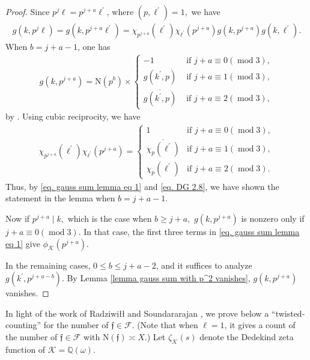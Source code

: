 \documentclass[11pt]{amsart}
\newcommand{\norm}{\mathrm{N}}
\numberwithin{equation}{section}
\newcommand{\mymod}[1]{(\operatorname{mod} #1)}
\theoremstyle{remark}
\begin{document}
\begin{proof}
    Since $p^j\ell=p^{j+a}\ell^\prime$, where $(p, \ell^\prime)=1,$ we have
    \begin{align}
    \label{eq. gauss sum lemma eq 1}
        g(k, p^j\ell)=g(k, p^{j+a}\ell^\prime)
        =\chi_{p^{j+a}}(\ell^\prime)\chi_{\ell^\prime}(p^{j+a})
        g(k, p^{j+a})g(k, \ell^\prime).
    \end{align}
    When $b=j+a-1$, one has
    \begin{align}
    \label{eq. DG 2.8}
        g(k, p^{j+a})=
        \norm(p^b)
        \times
        \begin{cases}
            -1 &\text{ if } j+a \equiv 0 \mymod{3},\\
             g(k^\prime, p) &\text{ if } j+a\equiv 1\mymod{3},\\
            \overline{g(k^\prime, p)} &\text{ if } j+a\equiv 2\mymod{3},
        \end{cases}
    \end{align}
    by \cite[Lemma 2.8]{DG}.
    Using cubic reciprocity, we have 
    \begin{align*}
    \chi_{p^{j+a}}(\ell^\prime)\chi_{\ell^\prime}(p^{j+a})
    =
    \begin{cases}
        1 &\text{if } j+a \equiv 0\mymod{3},\\
        \overline{\chi_p(\ell^\prime)} &\text{if } j+a \equiv 1\mymod{3},\\
        \chi_p(\ell^\prime) &\text{if } j+a \equiv 2\mymod{3}. 
    \end{cases}   
    \end{align*}
    Thus, by \eqref{eq. gauss sum lemma eq 1} and \eqref{eq. DG 2.8}, we have shown the statement in the lemma when $b=j+a-1.$

    Now if $p^{j+a} \mid k,$ which is the case when $b\ge j+a,$ $g(k, p^{j+a})$ is nonzero only if $j+a\equiv 0\mymod{3}$. In that case, the first three terms in \eqref{eq. gauss sum lemma eq 1} give $\phi_\mathcal{K}(p^{j+a})$. 

    In the remaining cases, $0\le b\le j+a-2$, and it suffices to analyze $g(k^\prime, p^{j+a-b})$. By Lemma \ref{lemma gauss sum with p^2 vanishes}, $g(k, p^{j+a})$ vanishes.
\end{proof}

In light of the work of {Radziwi\l\l} and Soundararajan \cite{RaSo}, we prove below a ``twisted-counting'' for the number of $\mathfrak{f}\in \mathcal{F}$. (Note that when $\ell=1$, it gives a count of the number of $\mathfrak{f}\in \mathcal{F}$ with $\norm(\mathfrak{f}) \asymp X$.) Let $\zeta_\mathcal{K}(s)$ denote the Dedekind zeta function of  $\mathcal{K}=\mathbb{Q}(\omega).$
\end{document}
